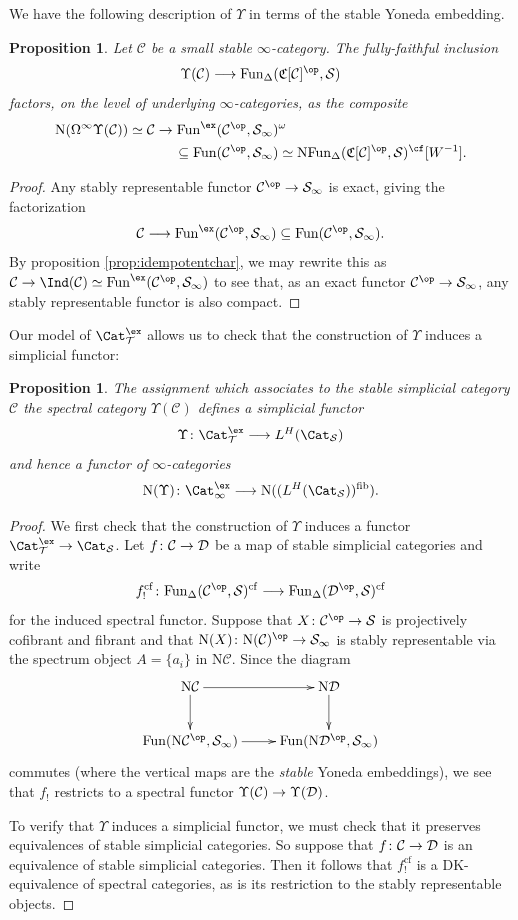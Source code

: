 \documentclass{amsart}
\renewcommand{\to}{\mathchoice{\longrightarrow}{\rightarrow}{\rightarrow}{\rightarrow}}
\newcommand{\cS}{{\mathcal S}}
\let\catsymbfont\mathcal
\newcommand{\aC}{{\catsymbfont{C}}}
\newcommand{\aD}{{\catsymbfont{D}}}
\newcommand{\aS}{{\catsymbfont{S}}}
\newcommand{\aT}{{\catsymbfont{T}}}
\newcommand{\C}{\catsymbfont{C}}
\newcommand{\T}{\mathcal{T}}
\newcommand{\N}{\mathrm{N}}
\newcommand{\stabcat}{\Cat_\i^{\ex}}
\newcommand{\Fun}{\mathrm{Fun}} %
\newcommand{\ispec}{\aS_{\infty}}
\newcommand{\Spcat}{\Cat_\mathcal{S}}%
\newcommand{\too}{\longrightarrow}%
\renewcommand{\i}{\infty}
\newcommand{\spect}{\Upsilon}
\numberwithin{equation}{section}
\newtheorem{proposition}[equation]{Proposition}
\theoremstyle{definition}
\begin{document}
We have the following description of $\spect$ in terms of the stable
Yoneda embedding.

\begin{proposition}\label{prop:stabrepisexact}
Let $\C$ be a small stable $\i$-category.
The fully-faithful inclusion
\[
\spect(\C)\to\Fun_\Delta(\mathfrak{C}[\C]^{\op},\cS)
\]
factors, on the level of underlying $\i$-categories, as the composite
\begin{align*}
\N(\Omega^\i\spect(\C))\simeq\C\rightarrow
 \Fun^{\ex}(\C^{\op},\ispec)&^\omega\\
 \subseteq\Fun(\C^{\op},\ispec)&\simeq\N\Fun_\Delta(\mathfrak{C}[\C]^{\op},\cS)^{\cf}[W^{-1}].
\end{align*}
\end{proposition}

\begin{proof}
Any stably representable functor $\C^{\op}\to\ispec$ is exact, giving
the factorization  
\[
\C\to\Fun^{\ex}(\C^{\op},\ispec)\subseteq\Fun(\C^{\op},\ispec).
\]
By proposition \ref{prop:idempotentchar}, we may rewrite this as
$\C\to\Ind(\C)\simeq\Fun^{\ex}(\C^{\op},\ispec)$ to see that, as an
exact functor $\C^{\op}\to\ispec$, any stably representable functor is
also compact. 
\end{proof}

Our model of $\Cat^{\ex}_\T$ allows us to check that the construction
of $\spect$ induces a simplicial functor:  

\begin{proposition}\label{prop:specfunc}
The assignment which associates to the stable simplicial category $\C$
the spectral category $\spect(\C)$ defines a simplicial functor
\[
\spect \colon \Cat^{\ex}_\T \too L^H(\Spcat)
\]
and hence a functor of $\i$-categories
\[
\N(\spect) \colon \stabcat \too \N((L^H(\Spcat))^{\mathrm{fib}}).
\]
\end{proposition}

\begin{proof}
We first check that the construction of $\spect$ induces a
functor $\Cat^{\ex}_\aT \to \Spcat$.  Let $f\colon\aC\to\aD$ be a map of
stable simplicial categories and write
\[
f_!^\mathrm{cf}\colon\Fun_\Delta(\C^{\op},\cS)^\mathrm{cf}\to\Fun_\Delta(\aD^{\op},\cS)^\mathrm{cf}\]
for
the induced spectral functor.  Suppose that $X\colon\C^{\op}\to \cS$ is
projectively cofibrant and fibrant and that $\N(X)\colon\N(\C)^{\op}\to\ispec$ is
stably representable via the spectrum object $A=\{a_i\}$ in $\N\C$.
Since the diagram
\[
\xymatrix{
\N\C\ar[r]\ar[d] & \N\aD\ar[d]\\
\Fun(\N\C^{\op},\ispec)\ar[r] & \Fun(\N\aD^{\op},\ispec)}
\]
commutes (where the vertical maps are the {\em stable} Yoneda
embeddings), we see that $f_!$ restricts to a spectral functor
$\spect(\aC)\to\spect(\aD)$.

To verify that $\spect$ induces a simplicial functor, we must check
that it preserves equivalences of stable simplicial categories.  So
suppose that $f\colon\C\to\aD$ is an equivalence of stable simplicial
categories.  Then it follows that $f_!^\mathrm{cf}$ is a
DK-equivalence of spectral categories, as is its restriction to the
stably representable objects.
\end{proof}
\end{document}
